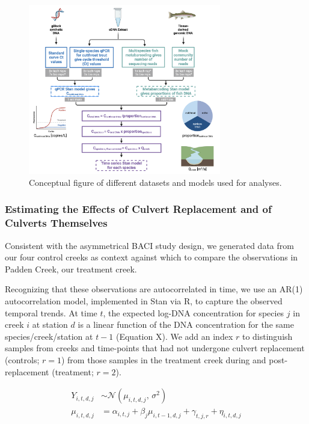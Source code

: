 \documentclass[
]{article}
\begin{document}
\begin{figure}
\centering
\includegraphics[width=0.75\textwidth,height=\textheight]{../Output/Figures/conceptual_figure.png}
\caption{Conceptual figure of different datasets and models used for
analyses.}
\end{figure}

\hypertarget{estimating-the-effects-of-culvert-replacement-and-of-culverts-themselves}{%
\subsubsection{Estimating the Effects of Culvert Replacement and of
Culverts
Themselves}\label{estimating-the-effects-of-culvert-replacement-and-of-culverts-themselves}}

Consistent with the asymmetrical BACI study design, we generated data
from our four control creeks as context against which to compare the
observations in Padden Creek, our treatment creek.

Recognizing that these observations are autocorrelated in time, we use
an AR(1) autocorrelation model, implemented in Stan via R, to capture
the observed temporal trends. At time \(t\), the expected log-DNA
concentration for species \(j\) in creek \(i\) at station \(d\) is a
linear function of the DNA concentration for the same
species/creek/station at \(t-1\) (Equation X). We add an index \(r\) to
distinguish samples from creeks and time-points that had not undergone
culvert replacement (controls; \(r = 1\)) from those samples in the
treatment creek during and post-replacement (treatment; \(r = 2\)).

\begin{align*}
 Y_{i,t,d,j} &\sim \mathcal{N}(\mu_{i,t,d,j},\,\sigma^{2})\\
\mu_{i,t,d,j} &= \alpha_{i,t,j} + \beta_{j}\mu_{i,t-1,d,j} + \gamma_{t,j,r} + \eta_{i,t,d,j}
\end{align*}
\end{document}
